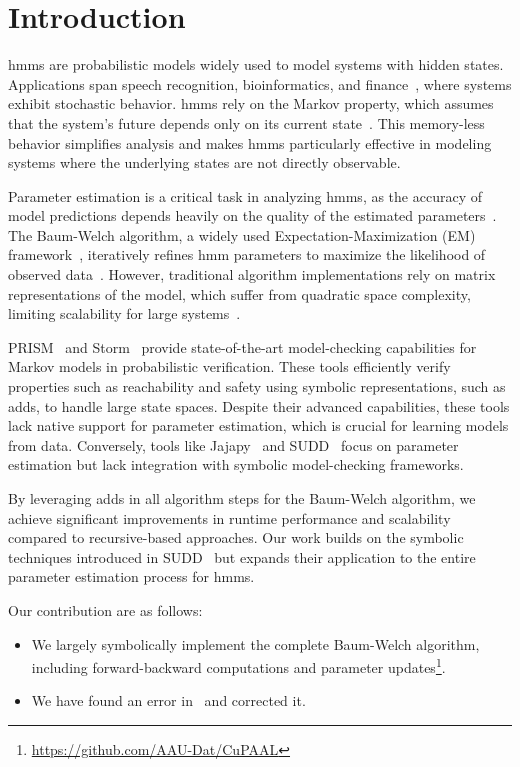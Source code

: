 \section{Introduction}\label{sec:introduction}
\glspl{hmm} are probabilistic models widely used to model systems with hidden states. 
Applications span speech recognition, bioinformatics, and finance~\cite{chavan2013overview,ciocchetta2009bio, mamon2007hidden}, where systems exhibit stochastic behavior. 
\glspl{hmm} rely on the Markov property, which assumes that the system's future depends only on its current state~\cite{baum1966statistical}. 
This memory-less behavior simplifies analysis and makes \glspl{hmm} particularly effective in modeling systems where the underlying states are not directly observable.

Parameter estimation is a critical task in analyzing \glspl{hmm}, as the accuracy of model predictions depends heavily on the quality of the estimated parameters~\cite{bacci2023mm}. 
The Baum-Welch algorithm, a widely used Expectation-Maximization (EM) framework~\cite{kenny2014deep}, iteratively refines \gls{hmm} parameters to maximize the likelihood of observed data~\cite{levinson1983introduction}. 
However, traditional algorithm implementations rely on matrix representations of the model, which suffer from quadratic space complexity, limiting scalability for large systems~\cite{davis2004comparing}.



PRISM~\cite{kwiatkowska2011prism} and Storm~\cite{hensel2021probabilistic} provide state-of-the-art model-checking capabilities for Markov models in probabilistic verification. 
These tools efficiently verify properties such as reachability and safety using symbolic representations, such as \glspl{add}, to handle large state spaces. 
Despite their advanced capabilities, these tools lack native support for parameter estimation, which is crucial for learning models from data. 
Conversely, tools like Jajapy~\cite{reynouard2023jajapy} and SUDD~\cite{p7} focus on parameter estimation but lack integration with symbolic model-checking frameworks.

By leveraging \glspl{add} in all algorithm steps for the Baum-Welch algorithm, we achieve significant improvements in runtime performance and scalability compared to recursive-based approaches. 
Our work builds on the symbolic techniques introduced in SUDD~\cite{p7} but expands their application to the entire parameter estimation process for \glspl{hmm}. 

Our contribution are as follows:
\begin{itemize}
    \item We largely symbolically implement the complete Baum-Welch algorithm, including forward-backward computations and parameter updates\footnote{\url{https://github.com/AAU-Dat/CuPAAL}}.
    \item We have found an error in~\cite{p7} and corrected it.
\end{itemize}

